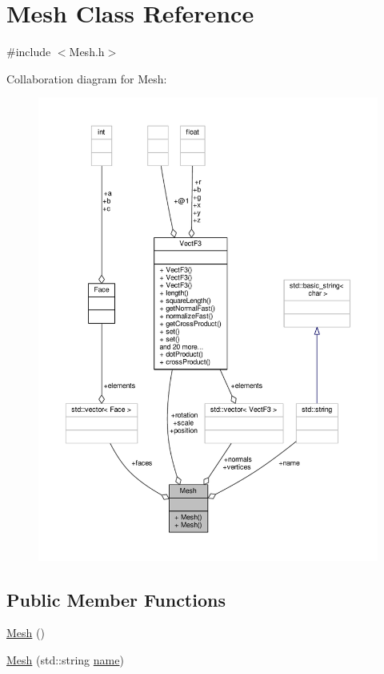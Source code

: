 \hypertarget{classMesh}{\section{Mesh Class Reference}
\label{classMesh}
}


{\ttfamily \#include $<$Mesh.\-h$>$}



Collaboration diagram for Mesh\-:
\nopagebreak
\begin{figure}[H]
\begin{center}
\leavevmode
\includegraphics[width=350pt]{classMesh__coll__graph}
\end{center}
\end{figure}
\subsection*{Public Member Functions}
\begin{DoxyCompactItemize}
\item 
\hyperlink{classMesh_a2af137f1571af89172b9c102302c416b}{Mesh} ()
\item 
\hyperlink{classMesh_a9b496cb615ff94d1e7d247eb89810791}{Mesh} (std\-::string \hyperlink{classMesh_ac687e9dcfc7cc60b046fc2ec634200be}{name})
\end{DoxyCompactItemize}
